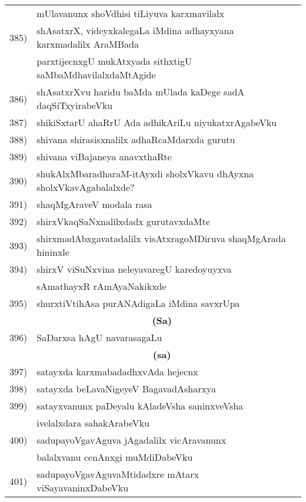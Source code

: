 {\begin{longtable}{@{}cp{7.4cm}r}
      & mUlavanunx shoVdhisi tiLiyuva karxmavilalx & \pageref{page216}\\
 385) & shAsatxrX, videyxkalegaLa iMdina adhayxyana karxmadalilx AraMBada& \\
      & parxtijecnxgU mukAtxyada sithxtigU saMbaMdhavilalxdaMtAgide & \pageref{page40}\\
 386) & shAsatxrXvu haridu baMda mUlada kaDege sadA daqSiTxyirabeVku & \pageref{page142}\\
 387) & shikiSxtarU ahaRrU Ada adhikAriLu niyukatxrAgabeVku  & \pageref{page47}\\
 388) & shivana shirasisxnalilx adhaRcaMdarxda gurutu & \pageref{page172}\\
 389) & shivana viBajaneya anavxthaRte & \pageref{page126}\\ 
 390) & shukAlxMbaradharaM-itAyxdi sholxVkavu dhAyxna sholxVkavAgabalalxde? & \pageref{page206}\\
 391) & shaqMgAraveV modala rasa & \pageref{page227}\\
 392) & shirxVkaqSaNxnalilxdadx gurutavxdaMte & \pageref{page107}\\
 393) & shirxmadAbxgavatadalilx visAtxragoMDiruva shaqMgArada hininxle & \pageref{page228}\\
 394) & shirxV viSuNxvina neleyavaregU karedoyuyxva & \\
      &  sAmathayxR rAmAyaNakikxde & \pageref{page238}\\
 395) & shurxtiVtihAsa purANAdigaLa iMdina savxrUpa & \pageref{page187}\\[0.3cm] 
      & \multicolumn{1}{c}{\textbf{(Sa)}} & \\[0.3cm]
 396) & SaDarxsa hAgU navarasagaLu & \pageref{page223}\\[0.3cm]
       & \multicolumn{1}{c}{\textbf{(sa)}} & \\[0.3cm] 
 397) & satayxda karxmabadadhxvAda hejecnx & \pageref{page76} \\
 398) & satayxda beLavaNigeyeV BagavadAsharxya & \pageref{page72}\\
 399) & satayxvanunx paDeyalu kAladeVsha saninxveVsha & \\
      & ivelalxdara sahakArabeVku & \pageref{page109}\\
400) & sadupayoVgavAguva jAgadalilx vicAravanunx & \\
     &  balalxvanu cenAnxgi muMdiDabeVku & \pageref{page248}\\ 
401) & sadupayoVgavAguvaMtidadxre mAtarx viSayavaninxDabeVku & \pageref{page252}\\

\end{longtable}}
